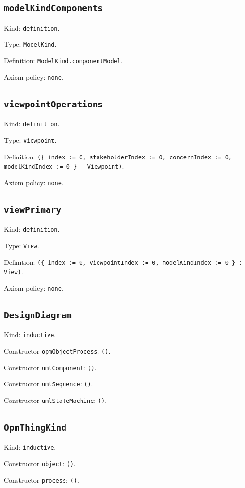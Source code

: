 \documentclass[11pt]{article}
\begin{document}
\subsection*{\texttt{modelKindComponents}}
\noindent Kind: \texttt{definition}.\par
\noindent Type: \texttt{ModelKind}.\par
\noindent Definition: \texttt{ModelKind.componentModel}.\par
\noindent Axiom policy: \texttt{none}.\par
\subsection*{\texttt{viewpointOperations}}
\noindent Kind: \texttt{definition}.\par
\noindent Type: \texttt{Viewpoint}.\par
\noindent Definition: \texttt{(\{ index := 0, stakeholderIndex := 0, concernIndex := 0, modelKindIndex := 0 \} : Viewpoint)}.\par
\noindent Axiom policy: \texttt{none}.\par
\subsection*{\texttt{viewPrimary}}
\noindent Kind: \texttt{definition}.\par
\noindent Type: \texttt{View}.\par
\noindent Definition: \texttt{(\{ index := 0, viewpointIndex := 0, modelKindIndex := 0 \} : View)}.\par
\noindent Axiom policy: \texttt{none}.\par
\subsection*{\texttt{DesignDiagram}}
\noindent Kind: \texttt{inductive}.\par
\noindent Constructor \texttt{opmObjectProcess}: \texttt{()}.\par
\noindent Constructor \texttt{umlComponent}: \texttt{()}.\par
\noindent Constructor \texttt{umlSequence}: \texttt{()}.\par
\noindent Constructor \texttt{umlStateMachine}: \texttt{()}.\par
\subsection*{\texttt{OpmThingKind}}
\noindent Kind: \texttt{inductive}.\par
\noindent Constructor \texttt{object}: \texttt{()}.\par
\noindent Constructor \texttt{process}: \texttt{()}.\par
\end{document}
